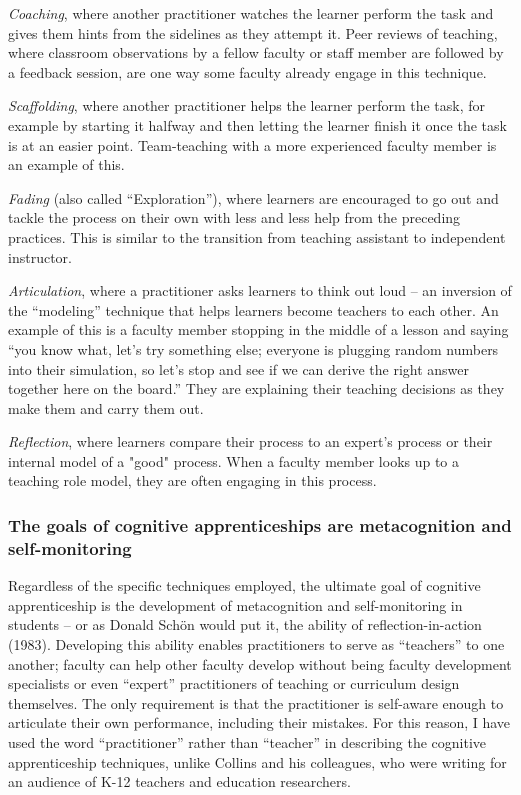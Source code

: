 \emph{Coaching}, where another practitioner watches the learner perform the task and gives them hints from the sidelines as they attempt it. Peer reviews of teaching, where classroom observations by a fellow faculty or staff member are followed by a feedback session, are one way some faculty already engage in this technique.

\emph{Scaffolding}, where another practitioner helps the learner perform the task, for example by starting it halfway and then letting the learner finish it once the task is at an easier point. Team-teaching with a more experienced faculty member is an example of this.

\emph{Fading} (also called “Exploration”), where learners are encouraged to go out and tackle the process on their own with less and less help from the preceding practices. This is similar to the transition from teaching assistant to independent instructor.

\emph{Articulation}, where a practitioner asks learners to think out loud – an inversion of the “modeling” technique that helps learners become teachers to each other. An example of this is a faculty member stopping in the middle of a lesson and saying “you know what, let’s try something else; everyone is plugging random numbers into their simulation, so let’s stop and see if we can derive the right answer together here on the board.” They are explaining their teaching decisions as they make them and carry them out.

\emph{Reflection}, where learners compare their process to an expert's process or their internal model of a "good" process. When a faculty member looks up to a teaching role model, they are often engaging in this process.

\subsubsection{The goals of cognitive apprenticeships are metacognition and self-monitoring}

Regardless of the specific techniques employed, the ultimate goal of cognitive apprenticeship is the development of metacognition and self-monitoring in students – or as Donald Schön would put it, the ability of reflection-in-action (1983). Developing this ability enables practitioners to serve as “teachers” to one another; faculty can help other faculty develop without being faculty development specialists or even “expert” practitioners of teaching or curriculum design themselves. The only requirement is that the practitioner is self-aware enough to articulate their own performance, including their mistakes. For this reason, I have used the word “practitioner” rather than “teacher” in describing the cognitive apprenticeship techniques, unlike Collins and his colleagues, who were writing for an audience of K-12 teachers and education researchers.


